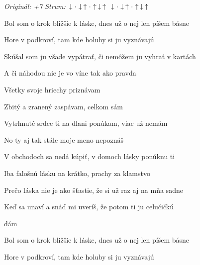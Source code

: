 \begin{song}


\begin{headerbox}
 \quad
\textit{Originál: +7} \quad
\textit{Strum:} $\Down\Miss\Down\Up\Miss\Up\Down\Up$ $\Down\Miss\Down\Up\Miss\Up\Down\Up$
\end{headerbox}

\begin{hchordbox}
\end{hchordbox}

\Large

\bigskip

Bol som o krok bližšie k láske, dnes už o nej len píšem básne \par
Hore v podkroví, tam kde holuby si ju vyznávajú \par
{}Skúšal som ju všade vypátrať, či nemôžem ju vyhrať v kartách \par
A či náhodou nie je vo víne tak ako pravda \par
{} 

\bigskip

\begin{chorusbox}{\Refren}
Všetky svoje hriechy priznávam \par
{}Zbitý a zranený zaspávam, celkom sám \par
Vytrhnuté srdce ti na dlani ponúkam, viac už nemám \par
No ty aj tak stále moje meno nepoznáš \par
\end{chorusbox}

\bigskip

V obchodoch sa nedá kúpiť, v domoch lásky ponúknu ti \par
Iba falošnú lásku na krátko, prachy za klamstvo \par
Prečo láska nie je ako šťastie, že si už raz aj na mňa sadne \par
Keď sa unaví a snáď mi uveríš, že potom ti ju celučičkú \par
{}dám  \par

\bigskip

\Refren

\bigskip

Bol som o krok bližšie k láske, dnes už o nej len píšem básne \par
Hore v podkroví, tam kde holuby si ju vyznávajú \par

\bigskip

\Refren

\end{song}
